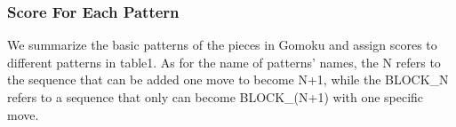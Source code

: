 \documentclass[a4paper, 12pt]{article} %
\begin{document}
\begin{multicols}{2}
  \subsubsection{Score For Each Pattern}
  We summarize the basic patterns of the pieces in Gomoku and assign scores to different patterns in table1. As for the name of patterns' names, the N refers to the sequence that can be added one move to become N+1, while the BLOCK\_N refers to a sequence that only can become BLOCK\_(N+1) with one specific move.
    \begin{table}[H]
    \setlength\tabcolsep{3pt}
    \begin{center}
\end{center}
\end{table}
\end{multicols}
\end{document}
